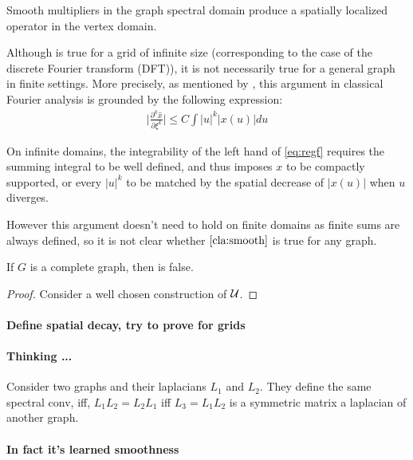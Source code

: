 \begin{claim} Smooth multipliers in the graph spectral domain produce a spatially localized operator in the vertex domain.
\label{cla:smooth}
\end{claim}

Although  is true for a grid of infinite size (corresponding to the case of the discrete Fourier transform (DFT)), it is not necessarily true for a general graph in finite settings. More precisely, as mentioned by \cite{henaff2015deep}, this argument in classical Fourier analysis is grounded by the following expression:
\begin{gather}
\bigg|\frac{\partial^k{\hat{x}}}{\partial{\xi^k}}\bigg| \leq C \int |u|^k|x(u)|du \label{eq:regf}
\end{gather}

On infinite domains, the integrability of the left hand of \eqref{eq:regf} requires the summing integral to be well defined, and thus imposes $x$ to be compactly supported, or every $|u|^k$ to be matched by the spatial decrease of $|x(u)|$ when $u$ diverges.

However this argument doesn't need to hold on finite domains as finite sums are always defined, so it is not clear whether $\ref{cla:smooth}$ is true for any graph.

\begin{proposition} If $G$ is a complete graph, then  is false.
\end{proposition}

\begin{proof}
Consider a well chosen construction of $\mathcal{U}$.
\end{proof}

\paragraph{Define spatial decay, try to prove for grids}

\paragraph{Thinking ...}
Consider two graphs and their laplacians $L_1$ and $L_2$. They define the same spectral conv, iff, $L_1L_2 = L_2L_1$ iff $L_3 = L_1L_2 $ is a symmetric matrix \ie a laplacian of another graph.

\paragraph{In fact it's learned smoothness}

